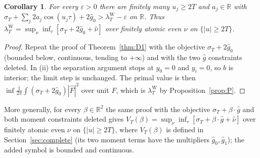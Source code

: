 \documentclass[10pt]{amsart}
\newtheorem{corollary}[theorem]{Corollary}
\theoremstyle{definition}
\theoremstyle{remark}
\newcommand{\R}{\mathbb R}
\newcommand{\lamW}{\lambda^{\mathrm W}_T}
\newcommand{\sT}{\sigma_T}
\newcommand{\gh}[1]{\widehat g_{#1}}
\newcommand{\nuh}{\widehat\nu}
\newcommand{\Fh}{\widehat F}
\begin{document}
\begin{corollary}\label{cor:D1W}
For every $\varepsilon>0$ there are finitely many $u_j\ge2T$ and $a_j\in\R$ with
$\sT+\sum_j2a_j\cos(u_j\tau)+2\gh0>\lamW-\varepsilon$ on $\R$. Thus
$\lamW=\sup_\nu\inf_\tau[\sT+2\gh0+\nuh]$ over finitely atomic even $\nu$ on $\{|u|\ge2T\}$.
\end{corollary}
\begin{proof}
Repeat the proof of Theorem~\ref{thm:D1} with the objective $\sT+2\gh0$ (bounded below, continuous,
tending to $+\infty$) and with the two $\widehat g$ constraints deleted. In (ii) the separation argument
stops at $y_0=0$ and $y_i=0$, so $b$ is interior; the limit step is unchanged. The primal value is then
$\inf\frac1{2\pi}\int(\sT+2\gh0)|\Fh|^2$ over unit $F$, which is $\lamW$ by Proposition~\ref{prop:P}.
\end{proof}
More generally, for every $\beta\in\R^2$ the same proof with the objective $\sT+\beta\cdot\widehat g$
and both moment constraints deleted gives $V_T(\beta)=\sup_\nu\inf_\tau[\sT+\beta\cdot\widehat g+\nuh]$ over
finitely atomic even $\nu$ on $\{|u|\ge2T\}$, where $V_T(\beta)$ is defined in Section~\ref{sec:complete}
(its two moment terms have the multipliers $\gh0,\gh1$); the added symbol is bounded and continuous.
\end{document}
